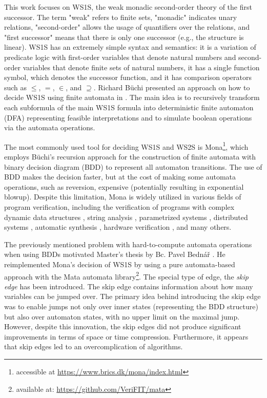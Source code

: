 \documentclass[pdflatex,sn-mathphys-num]{sn-jnl}%
\theoremstyle{thmstyleone}%
\theoremstyle{thmstyletwo}%
\theoremstyle{thmstylethree}%
\begin{document}
    This work focuses on WS1S, the weak monadic second-order theory of the first successor. The term "weak" refers to finite sets, "monadic" indicates unary relations, "second-order" allows the usage of quantifiers over the relations, and "first successor" means that there is only one successor (e.g., the structure is linear).  WS1S \cite{WS1S} has an extremely simple syntax and semantics: it is a variation of predicate logic with first-order variables that denote natural numbers and second-order variables that denote finite sets of natural numbers, it has a single function symbol, which denotes the successor function, and it has comparison operators such as $\leq$, $=$, $\in$, and $\supseteq$. Richard Büchi presented an approach on how to decide WS1S using finite automata in \cite{Buchi}. The main idea is to recursively transform each subformula of the main WS1S formula into deterministic finite automaton (DFA) representing feasible interpretations and to simulate boolean operations via the automata operations.

    The most commonly used tool for deciding WS1S and WS2S is Mona\footnote{accessible at \url{https://www.brics.dk/mona/index.html}}, which employs Büchi's recursion approach for the construction of finite automata with binary decision diagram (BDD) to represent all automaton transitions. The use of BDD makes the decision faster, but at the cost of making some automata operations, such as reversion, expensive (potentially resulting in exponential blowup). Despite this limitation, Mona is widely utilized in various fields of program verification, including the verification of programs with complex dynamic data structures \cite{DDS1, DDS2}, string analysis \cite{string_analysis}, parametrized systems \cite{parametrized_systems}, distributed systems \cite{distributed_systems}, automatic synthesis \cite{automatic_synthesis}, hardware verification \cite{hardware_verification}, and many others.

    The previously mentioned problem with hard-to-compute automata operations when using BDDs motivated Master's thesis by Bc. Pavel Bednář \cite{Bednar}. He reimplemented Mona's decision of WS1S by using a pure automata-based approach with the Mata automata library\footnote{available at: \url{https://github.com/VeriFIT/mata}}. The special type of edge, the \textit{skip edge} has been introduced. The skip edge contains information about how many variables can be jumped over. The primary idea behind introducing the skip edge was to enable jumps not only over inner states (representing the BDD structure) but also over automaton states, with no upper limit on the maximal jump. However, despite this innovation, the skip edges did not produce significant improvements in terms of space or time compression. Furthermore, it appears that skip edges led to an overcomplication of algorithms.
\end{document}
